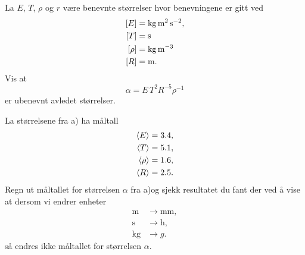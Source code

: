 \documentclass[a4paper,11pt]{article}
\begin{document}

\begin{problem}[11]
    \begin{subproblem}
        La $E$, $T$, $\rho$ og
        $r$ være benevnte størrelser hvor benevningene er gitt ved
        \begin{align*}
          \bpar{E}    &= \si{\kg\m\squared\per\s\squared},\\
          \bpar{T}    &= \si{\s}\\
          \bpar{\rho} &= \si{\kg\per\m\cubed}\\
          \bpar{R}    &= \si{\m}.
        \end{align*}
        Vis at
        \begin{equation*}
          \alpha = E\,T^2 R^{-5} \rho^{-1}
        \end{equation*}
        er ubenevnt avledet størrelser.
    \end{subproblem}
\end{problem}
\begin{subproblem}
      La størrelsene fra a) ha måltall
        \begin{align*}
          \langle E\rangle &= \num{3.4},\\
          \langle T\rangle &= \num{5.1},\\
          \langle\rho\rangle &= \num{1.6},\\
          \langle R\rangle &= \num{2.5}.
        \end{align*}
        Regn ut måltallet for størrelsen $\alpha$ fra a)og sjekk resultatet
        du fant der ved å vise at dersom vi endrer enheter
        \begin{align*}
          \si{\m}&\rightarrow \si{\mm},\\
          \si{\s}&\rightarrow \si{\hour},\\
          \si{\kg}&\rightarrow g.
        \end{align*}
        så endres ikke måltallet for størrelsen $\alpha$.
    \end{subproblem}
\end{document}
